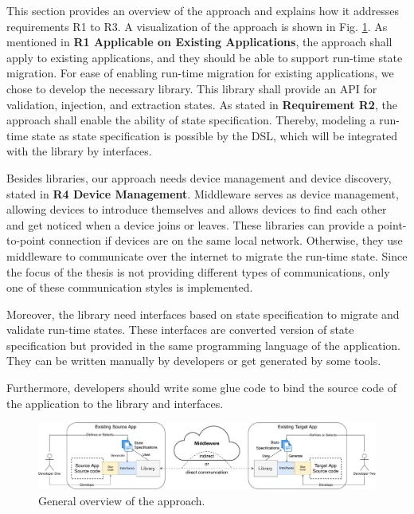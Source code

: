 This section provides an overview of the approach and explains how it addresses requirements R1 to R3.
A visualization of the approach is shown in Fig. \ref{fig:solution-overview}. As mentioned in \textbf{R1 Applicable on Existing Applications}, the approach shall apply to existing applications, and they should be able to support run-time state migration. For ease of enabling run-time migration for existing applications, we chose to develop the necessary library. This library shall provide an API for validation, injection, and extraction states. As stated in \textbf{Requirement R2}, the approach shall enable the ability of state specification. Thereby, modeling a run-time state as state specification is possible by the DSL, which will be integrated with the library by interfaces.

Besides libraries, our approach needs device management and device discovery, stated in \textbf{R4 Device Management}. Middleware serves as device management, allowing devices to introduce themselves and allows devices to find each other and get noticed when a device joins or leaves. These libraries can provide a point-to-point connection if devices are on the same local network. Otherwise, they use middleware to communicate over the internet to migrate the run-time state. Since the focus of the thesis is not providing different types of communications, only one of these communication styles is implemented.

Moreover, the library need interfaces based on state specification to migrate and validate run-time states. These interfaces are converted version of state specification but provided in the same programming language of the application. They can be written manually by developers or get generated by some tools.

Furthermore, developers should write some glue code to bind the source code of the application to the library and interfaces.

\vspace{10mm}
\FloatBarrier
\begin{figure}[H]
    \includegraphics[width=\linewidth]{../figures/solution-overview}
    \centering
    \caption{General overview of the approach.}
    \label{fig:solution-overview}
\end{figure}
\FloatBarrier